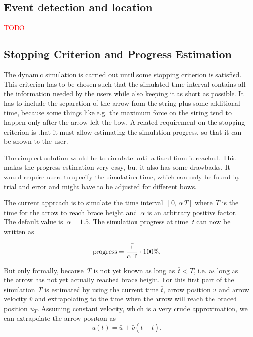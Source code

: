 \newpage
\subsection{Event detection and location}

\textcolor{red}{TODO}

\newpage
\subsection{Stopping Criterion and Progress Estimation}

The dynamic simulation is carried out until some stopping criterion is satisfied.
This criterion has to be chosen such that the simulated time interval contains all the information needed by the users while also keeping it as short as possible.
It has to include the separation of the arrow from the string plus some additional time, because some things like e.g. the maximum force on the string tend to happen only after the arrow left the bow.
A related requirement on the stopping criterion is that it must allow estimating the simulation progress, so that it can be shown to the user.

The simplest solution would be to simulate until a fixed time is reached.
This makes the progress estimation very easy, but it also has some drawbacks.
It would require users to specify the simulation time, which can only be found by trial and error and might have to be adjusted for different bows.

The current approach is to simulate the time interval~$[0,\,\alpha\,T]$ where~$T$ is the time for the arrow to reach brace height and~$\alpha$ is an arbitrary positive factor.
The default value is~$\alpha = 1.5$. The simulation progress at time~$\overline{t}$ can now be written as

\begin{equation}
\rm{progress} = \frac{\overline{t}}{\alpha\,T}\cdot 100\%.
\end{equation}

But only formally, because~$T$ is not yet known as long as~$\overline{t} < T$, i.e. as long as the arrow has not yet actually reached brace height.
For this first part of the simulation~$T$ is estimated by using the current time $\overline{t}$, arrow position $\overline{u}$ and arrow velocity $\overline{v}$ and extrapolating to the time when the arrow will reach the braced position $u_T$.
Assuming constant velocity, which is a very crude approximation, we can extrapolate the arrow position as
\begin{equation}
u(t) = \bar{u} + \bar{v}(t - \bar{t}).\label{eq:solution:progress:ansatz}
\end{equation}

